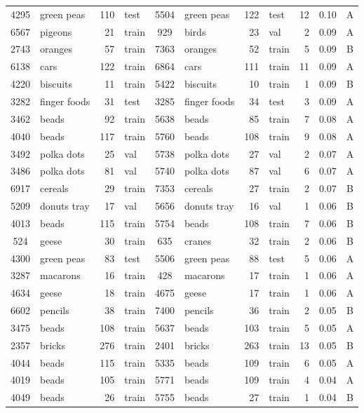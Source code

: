 \documentclass[letterpaper, 11pt]{IEEEtran}
\begin{document}
\begin{table*}[!ht]
{\begin{tabular}{clrlclrlrlc}
4295 & green peas & 110 & test & 5504 & green peas & 122 & test & 12 & 0.10 & A\\
6567 & pigeons & 21 & train & 929 & birds & 23 & val & 2 & 0.09 & A\\
2743 & oranges & 57 & train & 7363 & oranges & 52 & train & 5 & 0.09 & B\\
6138 & cars & 122 & train & 6864 & cars & 111 & train & 11 & 0.09 & A\\
4220 & biscuits & 11 & train & 5422 & biscuits & 10 & train & 1 & 0.09 & B\\
3282 & finger foods & 31 & test & 3285 & finger foods & 34 & test & 3 & 0.09 & A\\
3462 & beads & 92 & train & 5638 & beads & 85 & train & 7 & 0.08 & A\\
4040 & beads & 117 & train & 5760 & beads & 108 & train & 9 & 0.08 & A\\
3492 & polka dots & 25 & val & 5738 & polka dots & 27 & val & 2 & 0.07 & A\\
3486 & polka dots & 81 & val & 5740 & polka dots & 87 & val & 6 & 0.07 & A\\
6917 & cereals & 29 & train & 7353 & cereals & 27 & train & 2 & 0.07 & B\\
5209 & donuts tray & 17 & val & 5656 & donuts tray & 16 & val & 1 & 0.06 & B\\
4013 & beads & 115 & train & 5754 & beads & 108 & train & 7 & 0.06 & B\\
524 & geese & 30 & train & 635 & cranes & 32 & train & 2 & 0.06 & B\\
4300 & green peas & 83 & test & 5506 & green peas & 88 & test & 5 & 0.06 & A\\
3287 & macarons & 16 & train & 428 & macarons & 17 & train & 1 & 0.06 & A \\
4634 & geese & 18 & train & 4675 & geese & 17 & train & 1 & 0.06 & A\\
6602 & pencils & 38 & train & 7400 & pencils & 36 & train & 2 & 0.05 & B \\
3475 & beads & 108 & train & 5637 & beads & 103 & train & 5 & 0.05 & A\\
2357 & bricks & 276 & train & 2401 & bricks & 263 & train & 13 & 0.05 & B\\
4044 & beads & 115 & train & 5335 & beads & 109 & train & 6 & 0.05 & A\\
4019 & beads & 105 & train & 5771 & beads & 109 & train & 4 & 0.04 & A\\
4049 & beads & 26 & train & 5755 & beads & 27 & train & 1 & 0.04 & B\\

\end{tabular}}
\end{table*}
\end{document}
